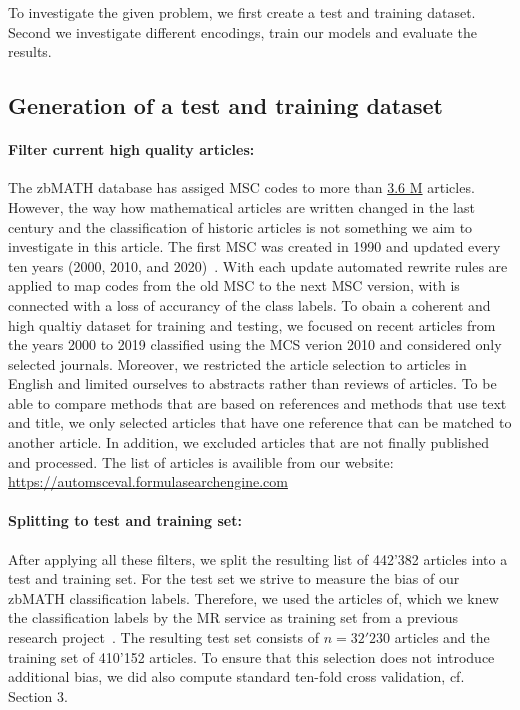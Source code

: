 To investigate the given problem, we first create a test and training dataset.
Second we investigate different encodings, train our models and evaluate the results.
\subsection{Generation of a test and training dataset}
\paragraph{Filter current high quality articles:}
The zbMATH database has assiged MSC codes to more than
\href{https://zbmath.org/?q=cc%3A*}%
{3.6 M} articles.
However, the way how mathematical articles are written changed in the last century and the classification of historic articles is not something we aim to investigate in this article.
The first MSC was created in 1990 and updated every ten years (2000, 2010, and 2020)~\cite{MSC2010}.
With each update automated rewrite rules are applied to map codes from the old MSC to the next MSC version, with is connected with a loss of accurancy of the class labels.
To obain a coherent and high qualtiy dataset for training and testing, we focused on recent articles from the years 2000 to 2019 classified using the MCS verion 2010 and considered only selected journals.
Moreover, we restricted the article selection to articles in English and limited ourselves to abstracts rather than reviews of articles.
To be able to compare methods that are based on references and methods that use text and title, we only selected articles that have one reference that
can be matched to another article.
In addition, we excluded articles that are not finally published and processed. The list of articles is availible from our website: \url{https://automsceval.formulasearchengine.com}
\paragraph{Splitting to test and training set:}
After applying all these filters, we split the resulting list of 442'382 articles into a test and training set.
For the test set we strive to measure the bias of our zbMATH classification labels.
Therefore, we used the articles of, which we knew the classification labels by the MR service as training set from a previous research project~\cite{Bannister2018}.
The resulting test set consists of $n=32'230$ articles and the training set of 410'152 articles.
To ensure that this selection does not introduce additional bias, we did also compute standard ten-fold cross validation, cf. Section 3.
